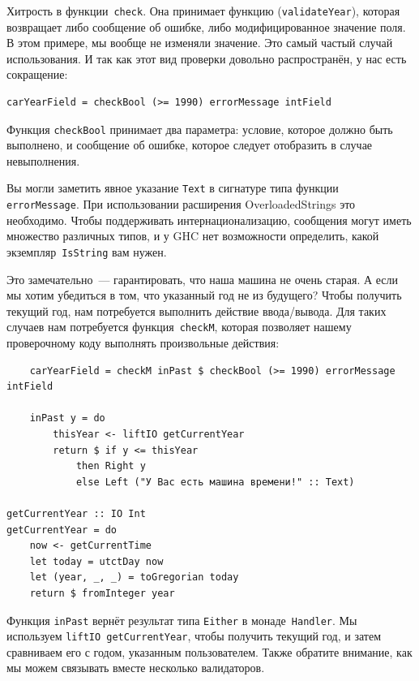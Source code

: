 Хитрость в функции~\lstinline'check'. Она принимает функцию
(\lstinline'validateYear'), которая возвращает либо сообщение об ошибке, либо
модифицированное значение поля. В этом примере, мы вообще не изменяли значение.
Это самый частый случай использования. И так как этот вид проверки довольно
распространён, у нас есть сокращение:

\begin{lstlisting}
carYearField = checkBool (>= 1990) errorMessage intField
\end{lstlisting}

Функция \lstinline'checkBool' принимает два параметра: условие, которое должно
быть выполнено, и сообщение об ошибке, которое следует отобразить в случае
невыполнения.

\begin{remark}
Вы могли заметить явное указание \lstinline'Text' в сигнатуре типа функции
\lstinline'errorMessage'. При использовании расширения OverloadedStrings это
необходимо. Чтобы поддерживать интернационализацию, сообщения могут иметь
множество различных типов, и у GHC нет возможности определить, какой
экземпляр~\lstinline'IsString' вам нужен.
\end{remark}

Это замечательно~--- гарантировать, что наша машина не очень старая. А если мы
хотим убедиться в том, что указанный год не из будущего? Чтобы получить текущий
год, нам потребуется выполнить действие ввода/вывода. Для таких случаев нам
потребуется функция~\lstinline'checkM', которая позволяет нашему проверочному
коду выполнять произвольные действия:

\begin{lstlisting}
    carYearField = checkM inPast $ checkBool (>= 1990) errorMessage intField

    inPast y = do
        thisYear <- liftIO getCurrentYear
        return $ if y <= thisYear
            then Right y
            else Left ("У Вас есть машина времени!" :: Text)

getCurrentYear :: IO Int
getCurrentYear = do
    now <- getCurrentTime
    let today = utctDay now
    let (year, _, _) = toGregorian today
    return $ fromInteger year
\end{lstlisting}%

Функция \lstinline'inPast' вернёт результат типа \lstinline'Either' в
монаде~\lstinline'Handler'. Мы используем \lstinline'liftIO getCurrentYear',
чтобы получить текущий год, и затем сравниваем его с годом, указанным
пользователем. Также обратите внимание, как мы можем связывать вместе несколько
валидаторов.

